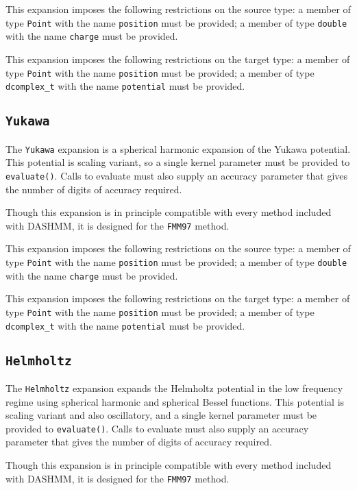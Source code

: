 This expansion imposes the following restrictions on the source type: a
member of type \texttt{Point} with the name \texttt{position} must be provided;
a member of type \texttt{double} with the name \texttt{charge} must be
provided.

This expansion imposes the following restrictions on the target type: a
member of type \texttt{Point} with the name \texttt{position} must be provided;
a member of type \texttt{dcomplex\_t} with the name \texttt{potential}
must be provided.

\subsection{\texttt{Yukawa}}

The \texttt{Yukawa} expansion is a spherical harmonic expansion of the Yukawa
potential. This potential is scaling variant, so a single kernel parameter
must be provided to \texttt{evaluate()}. Calls to evaluate must also supply an
accuracy parameter that gives the number of digits of accuracy required.

Though this expansion is in principle compatible with every method included
with DASHMM, it is designed for the \texttt{FMM97} method.

This expansion imposes the following restrictions on the source type: a
member of type \texttt{Point} with the name \texttt{position} must be provided;
a member of
type \texttt{double} with the name \texttt{charge} must be provided.

This expansion imposes the following restrictions on the target type: a
member of type \texttt{Point} with the name \texttt{position} must be provided;
a member of type \texttt{dcomplex\_t} with the name \texttt{potential}
 must be provided.

\subsection{\texttt{Helmholtz}}

The \texttt{Helmholtz} expansion expands the Helmholtz potential in the low
frequency regime using spherical harmonic and spherical Bessel functions.
This potential is scaling variant and also oscillatory, and a single kernel
parameter must be provided to \texttt{evaluate()}. Calls to evaluate must
also supply an accuracy parameter that gives the number of digits of
accuracy required.

Though this expansion is in principle compatible with every method included
with DASHMM, it is designed for the \texttt{FMM97} method.

